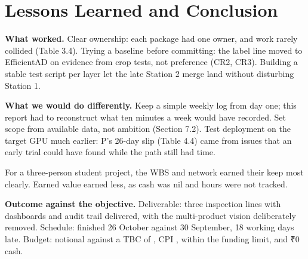 \section{Lessons Learned and Conclusion}
\textbf{What worked.} Clear ownership: each package had one owner, and work rarely collided (Table 3.4). Trying a baseline before committing: the label line moved to EfficientAD on evidence from crop tests, not preference (CR2, CR3). Building a stable test script per layer let the late Station 2 merge land without disturbing Station 1.

\textbf{What we would do differently.} Keep a simple weekly log from day one; this report had to reconstruct what ten minutes a week would have recorded. Set scope from available data, not ambition (Section 7.2). Test deployment on the target GPU much earlier: P's 26-day slip (Table 4.4) came from issues that an early trial could have found while the path still had time.


For a three-person student project, the WBS and network earned their keep most clearly. Earned value earned less, as cash was nil and hours were not tracked.

\textbf{Outcome against the objective.} Deliverable: three inspection lines with dashboards and audit trail delivered, with the multi-product vision deliberately removed. Schedule: finished 26 October against 30 September, 18 working days late. Budget: \vCAC{} notional against a TBC of \vTBC{}, CPI \vCPI{}, within the \vFUNDING{} funding limit, and ₹0 cash.
